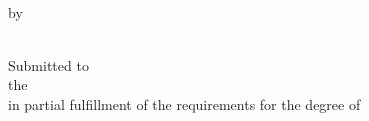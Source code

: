 \thispagestyle{empty}
\onehalfspacing
\begin{center}
	\null
	\vfill
	\MakeUppercase{\textbf{\thesistitle}} \\
	\vfill
	by \\
	\student \\

	\vspace{5em}

	Submitted to \\
	the \school \\
	in partial fulfillment of the requirements for the degree of \\
	\degree \\

	\vspace{5em}

	\uni \\
	\uniloc \\
	\month~\year
\end{center}
